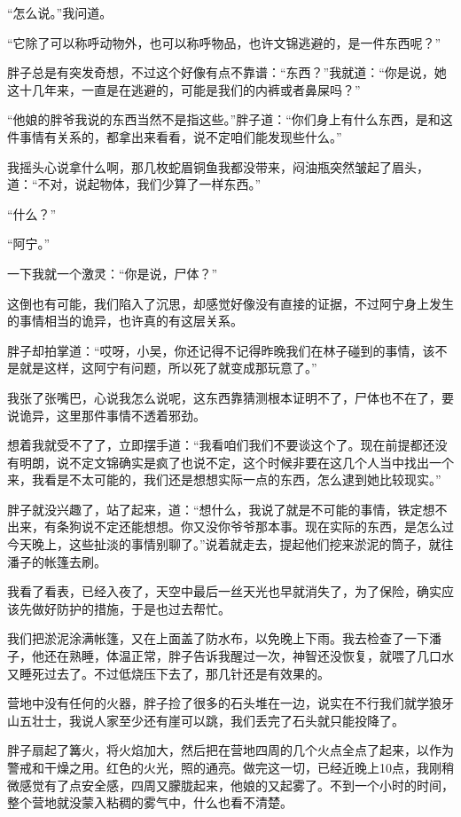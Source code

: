 “怎么说。”我问道。

“它除了可以称呼动物外，也可以称呼物品，也许文锦逃避的，是一件东西呢？”

胖子总是有突发奇想，不过这个好像有点不靠谱：“东西？”我就道：“你是说，她这十几年来，一直是在逃避的，可能是我们的内裤或者鼻屎吗？”

“他娘的胖爷我说的东西当然不是指这些。”胖子道：“你们身上有什么东西，是和这件事情有关系的，都拿出来看看，说不定咱们能发现些什么。”

我摇头心说拿什么啊，那几枚蛇眉铜鱼我都没带来，闷油瓶突然皱起了眉头，道：“不对，说起物体，我们少算了一样东西。”

“什么？”

“阿宁。”

一下我就一个激灵：“你是说，尸体？”

这倒也有可能，我们陷入了沉思，却感觉好像没有直接的证据，不过阿宁身上发生的事情相当的诡异，也许真的有这层关系。

胖子却拍掌道：“哎呀，小吴，你还记得不记得昨晚我们在林子碰到的事情，该不是就是这样，这阿宁有问题，所以死了就变成那玩意了。”

我张了张嘴巴，心说我怎么说呢，这东西靠猜测根本证明不了，尸体也不在了，要说诡异，这里那件事情不透着邪劲。

想着我就受不了了，立即摆手道：“我看咱们我们不要谈这个了。现在前提都还没有明朗，说不定文锦确实是疯了也说不定，这个时候非要在这几个人当中找出一个来，我看是不太可能的，我们还是想想实际一点的东西，怎么逮到她比较现实。”

胖子就没兴趣了，站了起来，道：“想什么，我说了就是不可能的事情，铁定想不出来，有条狗说不定还能想想。你又没你爷爷那本事。现在实际的东西，是怎么过今天晚上，这些扯淡的事情别聊了。”说着就走去，提起他们挖来淤泥的筒子，就往潘子的帐篷去刷。

我看了看表，已经入夜了，天空中最后一丝天光也早就消失了，为了保险，确实应该先做好防护的措施，于是也过去帮忙。

我们把淤泥涂满帐篷，又在上面盖了防水布，以免晚上下雨。我去检查了一下潘子，他还在熟睡，体温正常，胖子告诉我醒过一次，神智还没恢复，就喂了几口水又睡死过去了。不过低烧压下去了，那几针还是有效果的。

营地中没有任何的火器，胖子捡了很多的石头堆在一边，说实在不行我们就学狼牙山五壮士，我说人家至少还有崖可以跳，我们丢完了石头就只能投降了。

胖子扇起了篝火，将火焰加大，然后把在营地四周的几个火点全点了起来，以作为警戒和干燥之用。红色的火光，照的通亮。做完这一切，已经近晚上10点，我刚稍微感觉有了点安全感，四周又朦胧起来，他娘的又起雾了。不到一个小时的时间，整个营地就没蒙入粘稠的雾气中，什么也看不清楚。

